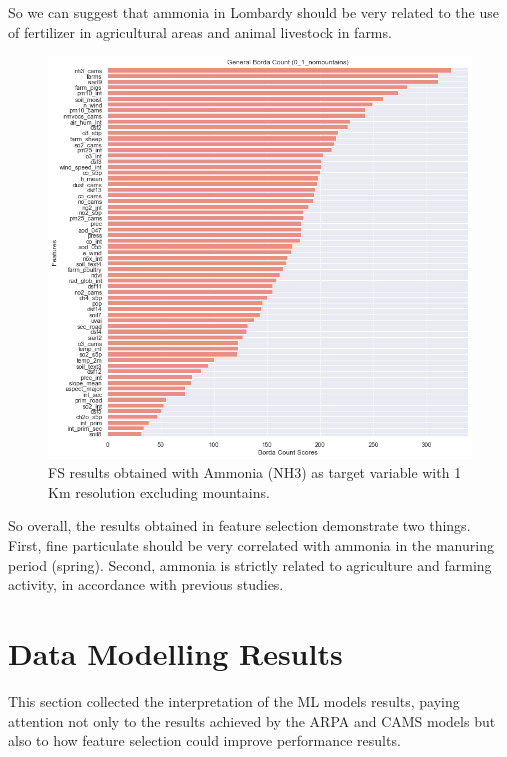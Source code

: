 So we can suggest that ammonia in Lombardy should be very related to the use of fertilizer in agricultural areas and animal livestock in farms.
\bigbreak
\pagebreak
\clearpage
\begin{figure}[H]
\centering
\includegraphics[scale =0.50]{images/tests/0_1_nomountainsnh3_st.png}
\caption{FS results obtained with Ammonia (NH3) as target variable with 1 Km resolution excluding mountains.}
\label{fig:fs_nh3}
\end{figure}
So overall, the results obtained in feature selection demonstrate two things.\\
First, fine particulate should be very correlated with ammonia in the manuring period (spring). Second, ammonia is strictly related to agriculture and farming activity, in accordance with previous studies.\pagebreak
\section{Data Modelling Results}
This section collected the interpretation of the ML models results, paying attention not only to the results achieved by the ARPA and CAMS models but also to how feature selection could improve performance results. 
